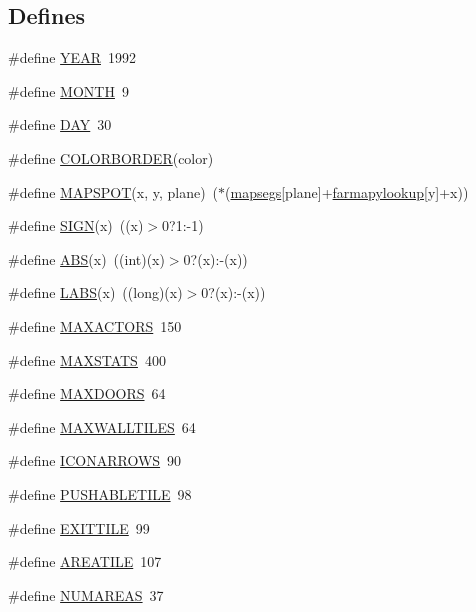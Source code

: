 \subsection*{Defines}
\begin{DoxyCompactItemize}
\item 
\#define \hyperlink{WL__DEF_8H_a5871356500f559add06ea81d60331b1b}{YEAR}~1992
\item 
\#define \hyperlink{WL__DEF_8H_a3729d06495d9713592f79f3122c9e677}{MONTH}~9
\item 
\#define \hyperlink{WL__DEF_8H_a509a01c55cbe47386fe24602b7c7fda1}{DAY}~30
\item 
\#define \hyperlink{WL__DEF_8H_a0ceae5b11f8e80530dd403ea3565a9e7}{COLORBORDER}(color)
\item 
\#define \hyperlink{WL__DEF_8H_afc5ed80ad82302932beb9e7b25c43a10}{MAPSPOT}(x, y, plane)~($\ast$(\hyperlink{ID__CA_8H_aa491c919acbb7c3a3626dc79014b7b7b}{mapsegs}\mbox{[}plane\mbox{]}+\hyperlink{WL__PLAY_8C_a2d3a9ae720f57b0ebde086d13cdb9af7}{farmapylookup}\mbox{[}y\mbox{]}+x))
\item 
\#define \hyperlink{WL__DEF_8H_a8c5ff70b6b28cd0157c50a22406f92c4}{SIGN}(x)~((x)$>$0?1:-\/1)
\item 
\#define \hyperlink{WL__DEF_8H_a996f7be338ccb40d1a2a5abc1ad61759}{ABS}(x)~((int)(x)$>$0?(x):-\/(x))
\item 
\#define \hyperlink{WL__DEF_8H_a30d8ef1c2f9a0b3a5f28064297d5101f}{LABS}(x)~((long)(x)$>$0?(x):-\/(x))
\item 
\#define \hyperlink{WL__DEF_8H_a01370265d65ff20ff5a573d296cfa0b1}{MAXACTORS}~150
\item 
\#define \hyperlink{WL__DEF_8H_a183670537542501b40fec39f9640a1ca}{MAXSTATS}~400
\item 
\#define \hyperlink{WL__DEF_8H_aa0e8aa03acd98849184e37cd2154fc21}{MAXDOORS}~64
\item 
\#define \hyperlink{WL__DEF_8H_af80993dce43b4b40d81ce13e5222707c}{MAXWALLTILES}~64
\item 
\#define \hyperlink{WL__DEF_8H_a475069b3bf107e5437fd08cf616313f2}{ICONARROWS}~90
\item 
\#define \hyperlink{WL__DEF_8H_a5df590fae093cc32e8a2069877374619}{PUSHABLETILE}~98
\item 
\#define \hyperlink{WL__DEF_8H_a2c610a32bb1d9d3265b2a65a68996118}{EXITTILE}~99
\item 
\#define \hyperlink{WL__DEF_8H_af1317821adcca4131d0673f439ccff16}{AREATILE}~107
\item 
\#define \hyperlink{WL__DEF_8H_a3b56a972731b824e14b203fee06611cc}{NUMAREAS}~37

\end{DoxyCompactItemize}
